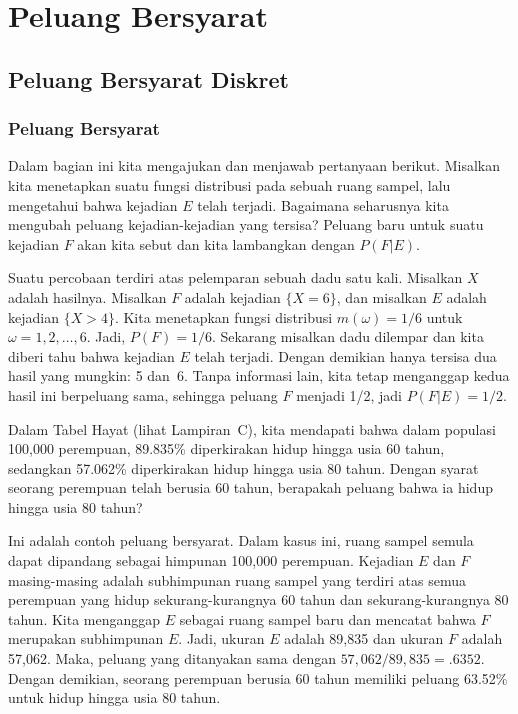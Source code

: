 
\chapter{Peluang Bersyarat}\label{chp 4}  

\section{Peluang Bersyarat Diskret}\label{sec 4.1} 

\subsection*{Peluang Bersyarat}
\par
Dalam bagian ini kita mengajukan dan menjawab pertanyaan berikut.  Misalkan kita menetapkan
suatu fungsi distribusi pada sebuah ruang sampel, lalu mengetahui bahwa kejadian $E$ telah
terjadi.  Bagaimana seharusnya kita mengubah peluang kejadian-kejadian yang tersisa?  Peluang
baru untuk suatu kejadian $F$ akan kita sebut  dan
kita lambangkan dengan
$P(F|E)$.

\begin{example}\label{exam 4.1}
Suatu percobaan terdiri atas pelemparan sebuah dadu satu kali.  Misalkan $X$ adalah hasilnya.  Misalkan $F$ adalah kejadian
$\{X = 6\}$, dan misalkan $E$ adalah kejadian $\{X > 4\}$.  Kita menetapkan
fungsi distribusi
$m(\omega) = 1/6$ untuk $\omega = 1, 2, \ldots , 6$.  Jadi, $P(F) =
1/6$.  Sekarang misalkan dadu dilempar dan kita diberi tahu bahwa kejadian $E$ telah terjadi.  
Dengan demikian hanya tersisa dua hasil yang mungkin: 5 dan~6.  Tanpa informasi lain, 
kita tetap menganggap kedua hasil ini berpeluang sama, sehingga 
peluang $F$ menjadi 1/2, jadi $P(F|E) = 1/2$.
\end{example}

\begin{example}\label{exam 4.1.5}
Dalam Tabel Hayat (lihat Lampiran~C), kita mendapati bahwa dalam populasi 100{,}000 perempuan, 89.835\%
diperkirakan hidup hingga usia 60 tahun, sedangkan 57.062\% diperkirakan hidup hingga usia 80 tahun.  Dengan syarat seorang perempuan telah berusia
60 tahun, berapakah peluang bahwa ia hidup hingga usia 80 tahun?
\par
Ini adalah contoh peluang bersyarat.  Dalam kasus ini, ruang sampel semula
dapat dipandang sebagai himpunan 100{,}000 perempuan.  Kejadian $E$ dan $F$ masing-masing adalah subhimpunan
ruang sampel yang terdiri atas semua perempuan yang hidup sekurang-kurangnya 60 tahun dan sekurang-kurangnya 80 tahun.
Kita menganggap $E$ sebagai ruang sampel baru dan mencatat bahwa $F$ merupakan subhimpunan $E$. 
Jadi, ukuran $E$ adalah 89{,}835 dan ukuran $F$ adalah 57{,}062.  Maka, peluang yang
ditanyakan sama dengan $57{,}062/89{,}835 = .6352$.  Dengan demikian, seorang perempuan berusia 60 tahun memiliki peluang 63.52\% untuk
hidup hingga usia 80 tahun.
\end{example}


